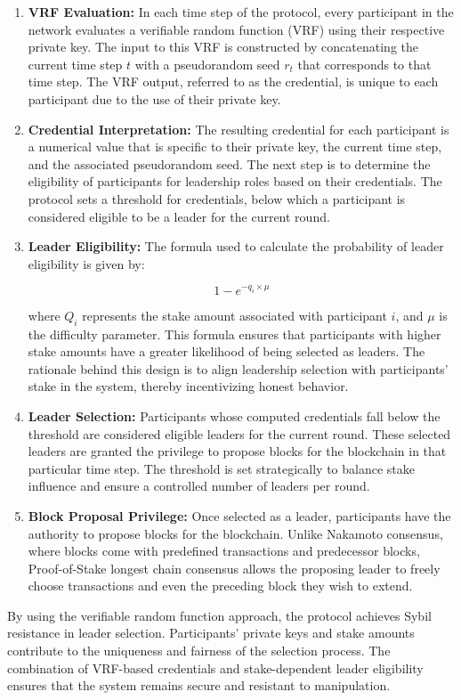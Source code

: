 \begin{enumerate}[label=\arabic*.]
    \item \textbf{VRF Evaluation:} In each time step of the protocol, every participant in the network evaluates a verifiable random function (VRF) using their respective private key. The input to this VRF is constructed by concatenating the current time step $t$ with a pseudorandom seed $r_{t}$ that corresponds to that time step. The VRF output, referred to as the credential, is unique to each participant due to the use of their private key.
    \item \textbf{Credential Interpretation:} The resulting credential for each participant is a numerical value that is specific to their private key, the current time step, and the associated pseudorandom seed. The next step is to determine the eligibility of participants for leadership roles based on their credentials. The protocol sets a threshold for credentials, below which a participant is considered eligible to be a leader for the current round.
    
    \item \textbf{Leader Eligibility:} The formula used to calculate the probability of leader eligibility is given by:
    
    $$1 - e^{-q_{i} \times \mu}$$
    
    where $Q_{i}$ represents the stake amount associated with participant $i$, and $\mu$ is the difficulty parameter. This formula ensures that participants with higher stake amounts have a greater likelihood of being selected as leaders. The rationale behind this design is to align leadership selection with participants' stake in the system, thereby incentivizing honest behavior.
    
    \item \textbf{Leader Selection:} Participants whose computed credentials fall below the threshold are considered eligible leaders for the current round. These selected leaders are granted the privilege to propose blocks for the blockchain in that particular time step. The threshold is set strategically to balance stake influence and ensure a controlled number of leaders per round.
    
    \item \textbf{Block Proposal Privilege:} Once selected as a leader, participants have the authority to propose blocks for the blockchain. Unlike Nakamoto consensus, where blocks come with predefined transactions and predecessor blocks, Proof-of-Stake longest chain consensus allows the proposing leader to freely choose transactions and even the preceding block they wish to extend.
\end{enumerate}
By using the verifiable random function approach, the protocol achieves Sybil resistance in leader selection. Participants' private keys and stake amounts contribute to the uniqueness and fairness of the selection process. The combination of VRF-based credentials and stake-dependent leader eligibility ensures that the system remains secure and resistant to manipulation.
